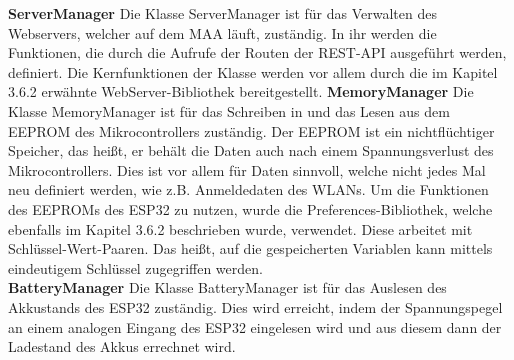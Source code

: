 \documentclass[11pt, twoside]{article}
\begin{document}
\vspace{4mm}\newline
\noindent \textbf{ServerManager}\newline
Die Klasse \glqq ServerManager\grqq{} ist für das Verwalten des Webservers, welcher auf dem MAA läuft, zuständig. In ihr werden die Funktionen, die durch die Aufrufe der Routen der REST-API ausgeführt werden, definiert. Die Kernfunktionen der Klasse werden vor allem durch die im Kapitel 3.6.2 erwähnte \glqq WebServer\grqq{}-Bibliothek bereitgestellt.
\vspace{4mm}\newline
\textbf{MemoryManager} \newline
Die Klasse \glqq MemoryManager\grqq{} ist für das Schreiben in und das Lesen aus dem EEPROM des Mikrocontrollers zuständig. Der EEPROM ist ein nichtflüchtiger Speicher, das heißt, er behält die Daten auch nach einem Spannungsverlust des Mikrocontrollers. Dies ist vor allem für Daten sinnvoll, welche nicht jedes Mal neu definiert werden, wie z.B. Anmeldedaten des WLANs. \parencite[vgl.][]{noauthor_urlpi27_2018}
Um die Funktionen des EEPROMs des ESP32 zu nutzen, wurde die \glqq Preferences\grqq{}-Bibliothek, welche ebenfalls im Kapitel 3.6.2 beschrieben wurde, verwendet. Diese arbeitet mit Schlüssel-Wert-Paaren. Das heißt, auf die gespeicherten Variablen kann mittels eindeutigem Schlüssel zugegriffen werden.
\newline \\
\textbf{BatteryManager} \newline
Die Klasse \glqq BatteryManager\grqq{} ist für das Auslesen des Akkustands des ESP32 zuständig. Dies wird erreicht, indem der Spannungspegel an einem analogen Eingang des ESP32 eingelesen wird und aus diesem dann der Ladestand des Akkus errechnet wird.
\end{document}
